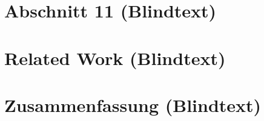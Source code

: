 \documentclass[ngerman]{ewks-latex}
\begin{document}
\section{Abschnitt 11 (Blindtext)}
\lipsum[31-32]

\section{Related Work (Blindtext)}
\lipsum[33-37]

\section{Zusammenfassung (Blindtext)}
\lipsum[42-44]


\newpage




\end{document}
